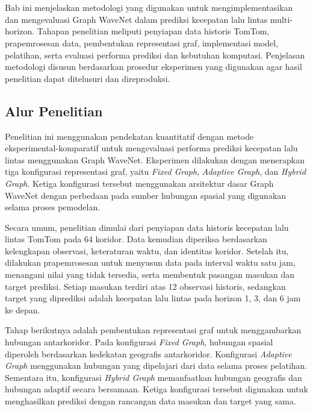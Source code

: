 \chapter{\babTiga}
\label{cha:metodologi}
\label{cha:metodologi_penelitian}

Bab ini menjelaskan metodologi yang digunakan untuk mengimplementasikan dan mengevaluasi Graph WaveNet dalam prediksi kecepatan lalu lintas multi-horizon. Tahapan penelitian meliputi penyiapan data historis TomTom, prapemrosesan data, pembentukan representasi graf, implementasi model, pelatihan, serta evaluasi performa prediksi dan kebutuhan komputasi. Penjelasan metodologi disusun berdasarkan prosedur eksperimen yang digunakan agar hasil penelitian dapat ditelusuri dan direproduksi.

\section{Alur Penelitian}
\label{sec:alur_penelitian}

Penelitian ini menggunakan pendekatan kuantitatif dengan metode eksperimental-komparatif untuk mengevaluasi performa prediksi kecepatan lalu lintas menggunakan Graph WaveNet. Eksperimen dilakukan dengan menerapkan tiga konfigurasi representasi graf, yaitu \textit{Fixed Graph}, \textit{Adaptive Graph}, dan \textit{Hybrid Graph}. Ketiga konfigurasi tersebut menggunakan arsitektur dasar Graph WaveNet dengan perbedaan pada sumber hubungan spasial yang digunakan selama proses pemodelan.

Secara umum, penelitian dimulai dari penyiapan data historis kecepatan lalu lintas TomTom pada 64 koridor. Data kemudian diperiksa berdasarkan kelengkapan observasi, keteraturan waktu, dan identitas koridor. Setelah itu, dilakukan prapemrosesan untuk menyusun data pada interval waktu satu jam, menangani nilai yang tidak tersedia, serta membentuk pasangan masukan dan target prediksi. Setiap masukan terdiri atas 12 observasi historis, sedangkan target yang diprediksi adalah kecepatan lalu lintas pada horizon 1, 3, dan 6 jam ke depan.

Tahap berikutnya adalah pembentukan representasi graf untuk menggambarkan hubungan antarkoridor. Pada konfigurasi \textit{Fixed Graph}, hubungan spasial diperoleh berdasarkan kedekatan geografis antarkoridor. Konfigurasi \textit{Adaptive Graph} menggunakan hubungan yang dipelajari dari data selama proses pelatihan. Sementara itu, konfigurasi \textit{Hybrid Graph} memanfaatkan hubungan geografis dan hubungan adaptif secara bersamaan. Ketiga konfigurasi tersebut digunakan untuk menghasilkan prediksi dengan rancangan data masukan dan target yang sama.

